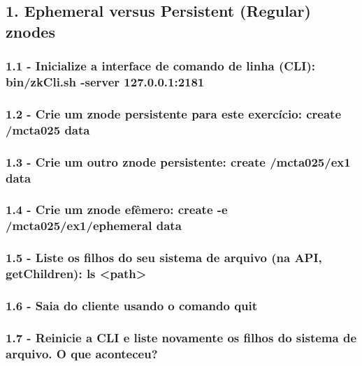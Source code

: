 \subsection*{1. Ephemeral versus Persistent (Regular) znodes}

\subsubsection{1.1 - Inicialize a interface de comando de linha (CLI): bin/zkCli.sh
-server 127.0.0.1:2181}

\subsubsection{1.2 - Crie um znode persistente para este exercício: create /mcta025 data}

\subsubsection{1.3 - Crie um outro znode persistente: create /mcta025/ex1 data}

\subsubsection{1.4 - Crie um znode efêmero: create -e /mcta025/ex1/ephemeral data}

\subsubsection{1.5 - Liste os filhos do seu sistema de arquivo (na API, getChildren): ls
<path>}

\subsubsection{1.6 - Saia do cliente usando o comando quit}

\subsubsection{1.7 - Reinicie a CLI e liste novamente os filhos do sistema de arquivo. O que aconteceu?}

